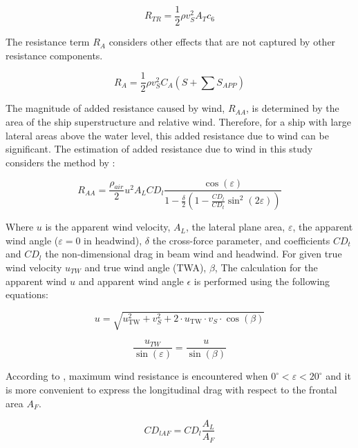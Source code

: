 \documentclass[]{interact}
\theoremstyle{plain}%
\theoremstyle{definition}
\theoremstyle{remark}
\begin{document}
\begin{equation}
  \label{eqn:R_transom}
  R_{TR} = \frac{1}{2}\rho v_S^2 A_T c_6
\end{equation}

The resistance term $R_A$ considers other effects that are not captured by other resistance components. 

\begin{equation}
  \label{eqn:R_a}
  R_A = \frac{1}{2}\rho v_S^2 C_A (S+\sum S_{APP})
\end{equation}

The magnitude of added resistance caused by wind, $R_{AA}$, is determined by the area of the ship superstructure and relative wind. Therefore, for a ship with large lateral areas above the water level, this added resistance due to wind can be significant. The estimation of added resistance due to wind in this study considers the method by \citet{Blendermann.1994}:

\begin{equation}
  \label{eqn:Raa_blendermann}
  R_{AA} = \frac{\rho_{air}}{2}u^2A_{L}CD_l \frac{\cos{(\varepsilon)}}{1-\frac{\delta}{2}(1-\frac{CD_l}{CD_t}\sin^2{(2\varepsilon)})}
\end{equation}

Where $u$ is the apparent wind velocity, $A_L$, the lateral plane area, $\varepsilon$, the apparent wind angle ($\varepsilon = 0$ in headwind), $\delta$ the cross-force parameter, and coefficients $CD_t$ and $CD_l$ the non-dimensional drag in beam wind and headwind. For given true wind velocity $u_{TW}$ and true wind angle (TWA), $\beta$, The calculation for the apparent wind $u$ and apparent wind angle $\epsilon$ is performed using the following equations:

\begin{equation}
  \label{eqn:u_AW}
  u = \sqrt{u_{\text{TW}}^2 + v_S^2 + 2 \cdot u_{\text{TW}} \cdot v_S \cdot \cos(\beta)}
\end{equation}

\begin{equation}
  \label{eqn:epsilon_AWA}
  \frac{u_{TW}}{\sin(\varepsilon)} = \frac{u}{\sin({\beta})}
\end{equation}

According to \citet{Schneekluth.1998}, maximum wind resistance is encountered when $0^\circ<\varepsilon<20^\circ$ and it is more convenient to express the longitudinal drag with respect to the frontal area $A_F$.

\begin{equation}
  \label{eqn:CDlaf}
  CD_{lAF} = CD_l \frac{A_L}{A_F}
\end{equation}
\end{document}
